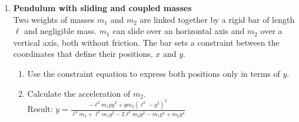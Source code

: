 \documentclass[11pt, a4paper, twoside]{article}
\begin{document}
\begin{enumerate}
	\item 
	\begin{minipage}[t][2.3cm]{0.75\textwidth}
		\textbf{Pendulum with sliding and coupled masses}\\ 
		Two weights of masses \(m_1\) and \(m_2\) are linked together by a rigid bar of length \(\ell\) and negligible mass.
		\(m_1\) can slide over an horizontal axis and \(m_2\) over a vertical axis, both without friction.
		The bar sets a constraint between the coordinates that define their positions, \(x\) and \(y\).
	\end{minipage}
	\begin{minipage}[c][1cm][t]{0.25\textwidth}
		
	\end{minipage}
	\begin{enumerate}
		\item Use the constraint equation to express both positions only in terms of \(y\).
		\item Calculate the acceleration of \(m_2\).\\
		Result:
			$\ddot{y} = \frac{- \ell^{2} m_{1} y \dot{y}^{2} + g m_{2} \left(\ell^{2} - y^{2}\right)^{2}}{\ell^{4} m_{2} + \ell^{2} m_{1} y^{2} - 2 \ell^{2} m_{2} y^{2} - m_{1} y^{4} + m_{2} y^{4}}$
			\qquad
	\end{enumerate}
	


\end{enumerate}
\end{document}

